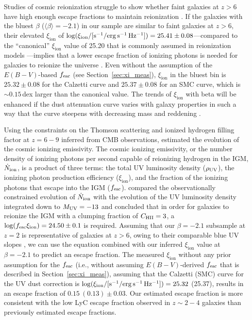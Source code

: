 \documentclass[iop]{emulateapj}
\newcommand{\xiion}{\ensuremath{\xi_{\mathrm{ion}}}}
\begin{document}
Studies of cosmic reionization struggle to show whether faint galaxies at $z>6$ have high enough escape fractions to maintain reionization \citep[e.g.,][]{vanzella10,siana15}. If the galaxies with the bluest $\beta$ ($\langle{\beta}\rangle=-2.1$) in our sample are similar to faint galaxies at $z>6$, their elevated {\xiion} of $\log(\xi_{\rm{ion}}/[{\rm{s^{-1}/erg\,s^{-1}\,Hz^{-1}}}])=25.41\pm 0.08$---compared to the ``canonical'' {\xiion} value of 25.20 that is commonly assumed in reionization models \citep{robertson13}---implies that a lower escape fraction of ionizing photons is needed for galaxies to reionize the universe \citep[see][]{robertson13,robertson15,bouwens16b,stanway16}. Even without the assumption of the $E(B-V)$-based $f_{\rm esc}$ (see Section~\ref{sec:xi_meas}), {\xiion} in the bluest bin is $25.32\pm 0.08$ for the Calzetti curve and $25.37 \pm 0.08$ for an SMC curve, which is $\sim 0.15$\,dex larger than the canonical \citet{robertson13} value.
The trends of {\xiion} with beta will be enhanced if the dust attenuation curve varies with galaxy properties in such a way that the curve steepens with decreasing mass and reddening \citep[as suggested by][]{reddy16a,salmon16}.

Using the constraints on the Thomson scattering and ionized hydrogen filling factor at $z=6-9$ inferred from CMB observations, \citet{bouwens15b} estimated the evolution of the cosmic ionizing emissivity. The cosmic ionizing emissivity, or the number density of ionizing photons per second capable of reionizing hydrogen in the IGM, $\dot{N}_{\rm ion}$, is a product of three terms: the total UV luminosity density ($\rho_{\rm UV}$), the ionizing photon production efficiency ({\xiion}), and the fraction of the ionizing photons that escape into the IGM ($f_{\rm esc}$). \citet{bouwens15b} compared the observationally constrained evolution of $\dot{N}_{\rm ion}$ with the evolution of the UV luminosity density integrated down to $M_{\rm UV}=-13$ and concluded that in order for galaxies to reionize the IGM with a clumping fraction of $C_{\rm HII}=3$, a $\log(f_{\rm esc} \xi_{\rm ion}) = 24.50\pm 0.1$ is required. 
Assuming that our $\beta=-2.1$ subsample at $z=2$ is representative of galaxies at $z>6$, owing to their comparable blue UV slopes \citep{dunlop12,bouwens14}, we can use the \citet{bouwens15b} equation combined with our inferred {\xiion} value at $\beta = -2.1$ to predict an escape fraction.
The measured {\xiion} without any prior assumption for the $f_{\rm esc}$ (i.e., without assuming $E(B-V)$-derived $f_{\rm esc}$ that is described in Section~\ref{sec:xi_meas}), assuming that the Calzetti (SMC) curve for the UV dust correction is $\log(\xi_{\rm{ion}}/[{\rm{s^{-1}/erg\,s^{-1}\,Hz^{-1}}}])=25.32$ (25.37), results in an escape fraction of $0.15~(0.13)\pm 0.03$.
Our estimated escape fraction is more consistent with the low LyC escape fraction observed in $z\sim 2-4$ galaxies \citep[e.g.,][]{chen07,nestor13,siana15,grazian17,japelj17} than previously estimated escape fractions. 
\end{document}
